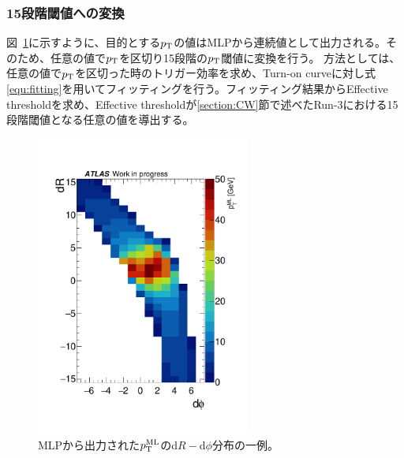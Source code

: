 \subsubsection{15段階閾値への変換}
図~\ref{fig:all_output}に示すように、目的とする$p_{\rm{T}}$の値はMLPから連続値として出力される。そのため、任意の値で$p_{\rm{T}}$を区切り15段階の$p_{\rm{T}}$閾値に変換を行う。
方法としては、任意の値で$p_{\rm{T}}$を区切った時のトリガー効率を求め、Turn-on curveに対し式\eqref{equ:fitting}を用いてフィッティングを行う。フィッティング結果からEffective thresholdを求め、Effective thresholdが\ref{section:CW}節で述べたRun-3における15段階閾値となる任意の値を導出する。
\begin{figure}[tb]
  \centering
  \hspace*{-1cm}
  \includegraphics[clip, width=7cm]{fig/4/data_phi0_roi33_output.pdf}
  \caption{MLPから出力された$p_{\rm{T}}^{\rm{ML}}$のd$R-$d$\phi$分布の一例。}
  \label{fig:all_output}
\end{figure}

